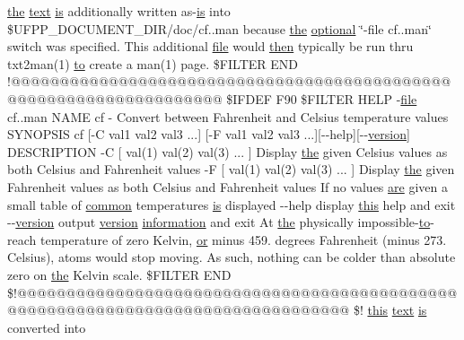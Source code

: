 \hyperlink{M__stopwatch_83_8txt_a0f266597de2e57eb3aa964927bb30e14}{the} \hyperlink{README_8txt_afda9e6898bd09238e9e9be4c62ce246b}{text} \hyperlink{intro__blas1_83_8txt_a42a91df93f840595de3019ceb5d1df23}{is} additionally written as-\/\hyperlink{intro__blas1_83_8txt_a42a91df93f840595de3019ceb5d1df23}{is} into \$U\+F\+P\+P\+\_\+\+D\+O\+C\+U\+M\+E\+N\+T\+\_\+\+D\+IR/doc/cf..\+man because \hyperlink{M__stopwatch_83_8txt_a0f266597de2e57eb3aa964927bb30e14}{the} \hyperlink{option__stopwatch_83_8txt_aa4ece75e7acf58a4843f70fe18c3ade5}{optional} \char`\"{}-\/file cf..\+man\char`\"{} switch was specified. This additional \hyperlink{what__overview_81_8txt_a447b56c526e8da30e0dc94673727ee25}{file} would \hyperlink{intro__blas1_83_8txt_aeaad1761c101f906d503f68274bd4b83}{then} typically be run thru txt2man(1) \hyperlink{M__stopwatch_83_8txt_a97209fd3e34ef701c0a9734280779cbb}{to} create a man(1) page. \$F\+I\+L\+T\+ER E\+ND !@@@@@@@@@@@@@@@@@@@@@@@@@@@@@@@@@@@@@@@@@@@@@@@@@@@@@@@@@@@@@@@@@@@ \$I\+F\+D\+EF F90 \$F\+I\+L\+T\+ER H\+E\+LP -\/\hyperlink{what__overview_81_8txt_a447b56c526e8da30e0dc94673727ee25}{file} cf..\+man N\+A\+ME cf -\/ Convert between Fahrenheit and Celsius temperature values S\+Y\+N\+O\+P\+S\+IS cf \mbox{[}-\/C val1 val2 val3 ...\mbox{]} \mbox{[}-\/F val1 val2 val3 ...\mbox{]}\mbox{[}-\/-\/help\mbox{]}\mbox{[}-\/-\/\hyperlink{inquiry__stopwatch_83_8txt_aee378be19d20935dd436517beda00ee4}{version}\mbox{]} D\+E\+S\+C\+R\+I\+P\+T\+I\+ON -\/C \mbox{[} val(1) val(2) val(3) ... \mbox{]} Display \hyperlink{M__stopwatch_83_8txt_a0f266597de2e57eb3aa964927bb30e14}{the} given Celsius values as both Celsius and Fahrenheit values -\/F \mbox{[} val(1) val(2) val(3) ... \mbox{]} Display \hyperlink{M__stopwatch_83_8txt_a0f266597de2e57eb3aa964927bb30e14}{the} given Fahrenheit values as both Celsius and Fahrenheit values If no values \hyperlink{M__stopwatch_83_8txt_a5040be02b832eba08820289c8a1f81c4}{are} given a small table of \hyperlink{strgar3_8f90_a96cfa8fe4e730b87185eb5629575c039}{common} temperatures \hyperlink{intro__blas1_83_8txt_a42a91df93f840595de3019ceb5d1df23}{is} displayed -\/-\/help display \hyperlink{M__stopwatch_83_8txt_ad62a52042bb610eee5b36b5516caec22}{this} help and exit -\/-\/\hyperlink{inquiry__stopwatch_83_8txt_aee378be19d20935dd436517beda00ee4}{version} output \hyperlink{inquiry__stopwatch_83_8txt_aee378be19d20935dd436517beda00ee4}{version} \hyperlink{M__stopwatch_83_8txt_a9f7f0ce21871efda7da3eda76d1d3cff}{information} and exit At \hyperlink{M__stopwatch_83_8txt_a0f266597de2e57eb3aa964927bb30e14}{the} physically impossible-\/\hyperlink{M__stopwatch_83_8txt_a97209fd3e34ef701c0a9734280779cbb}{to}-\/reach temperature of zero Kelvin, \hyperlink{what__overview_81_8txt_a93f5d39a36ed511cc0dc88a20a517388}{or} minus 459. degrees Fahrenheit (minus 273. Celsius), atoms would stop moving. As such, nothing can be colder than absolute zero on \hyperlink{M__stopwatch_83_8txt_a0f266597de2e57eb3aa964927bb30e14}{the} Kelvin scale. \$F\+I\+L\+T\+ER E\+ND \$!@@@@@@@@@@@@@@@@@@@@@@@@@@@@@@@@@@@@@@@@@@@@@@@@@@@@@@@@@@@@@@@@@@@@@@@@@@@@@@@@ \$! \hyperlink{M__stopwatch_83_8txt_ad62a52042bb610eee5b36b5516caec22}{this} \hyperlink{README_8txt_afda9e6898bd09238e9e9be4c62ce246b}{text} \hyperlink{intro__blas1_83_8txt_a42a91df93f840595de3019ceb5d1df23}{is} converted into 